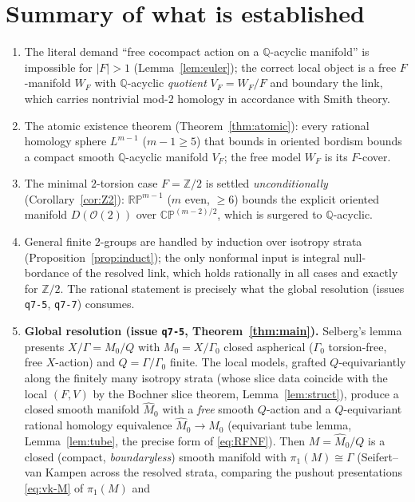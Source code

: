 \documentclass[12pt]{article}
\theoremstyle{definition}
\begin{document}
\section{Summary of what is established}\label{sec:summary}

\begin{enumerate}
\item The literal demand ``free cocompact action on a $\mathbb{Q}$-acyclic
manifold'' is impossible for $|F|>1$ (Lemma~\ref{lem:euler}); the correct local
object is a free $F$-manifold $W_F$ with $\mathbb{Q}$-acyclic \emph{quotient}
$V_F=W_F/F$ and boundary the link, which carries nontrivial mod-$2$ homology in
accordance with Smith theory.
\item The atomic existence theorem (Theorem~\ref{thm:atomic}): every rational
homology sphere $L^{m-1}$ ($m-1\ge5$) that bounds in oriented bordism bounds a
compact smooth $\mathbb{Q}$-acyclic manifold $V_F$; the free model $W_F$ is its
$F$-cover.
\item The minimal $2$-torsion case $F=\mathbb{Z}/2$ is settled
\emph{unconditionally} (Corollary~\ref{cor:Z2}): $\mathbb{RP}^{m-1}$
($m$ even, $\ge6$) bounds the explicit oriented manifold $D(\mathcal{O}(2))$
over $\mathbb{CP}^{(m-2)/2}$, which is surgered to $\mathbb{Q}$-acyclic.
\item General finite $2$-groups are handled by induction over isotropy strata
(Proposition~\ref{prop:induct}); the only nonformal input is integral
null-bordance of the resolved link, which holds rationally in all cases and
exactly for $\mathbb{Z}/2$. The rational statement is precisely what the global
resolution (issues \texttt{q7-5}, \texttt{q7-7}) consumes.
\item \textbf{Global resolution (issue \texttt{q7-5}, Theorem~\ref{thm:main}).}
Selberg's lemma presents $X/\Gamma=M_0/Q$ with $M_0=X/\Gamma_0$ closed
aspherical ($\Gamma_0$ torsion-free, free $X$-action) and $Q=\Gamma/\Gamma_0$
finite. The local models, grafted $Q$-equivariantly along the finitely many
isotropy strata (whose slice data coincide with the local $(F,V)$ by the Bochner
slice theorem, Lemma~\ref{lem:struct}), produce a closed smooth manifold
$\widehat M_0$ with a \emph{free} smooth $Q$-action and a $Q$-equivariant
rational homology equivalence $\widehat M_0\to M_0$ (equivariant tube lemma,
Lemma~\ref{lem:tube}, the precise form of \eqref{eq:RFNF}). Then
$M=\widehat M_0/Q$ is a closed (compact, \emph{boundaryless}) smooth manifold
with $\pi_1(M)\cong\Gamma$ (Seifert--van Kampen across the resolved strata,
comparing the pushout presentations \eqref{eq:vk-M} of $\pi_1(M)$ and

\end{enumerate}
\end{document}
